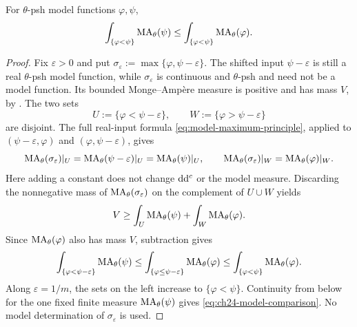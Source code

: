 \begin{proposition}
\label{prop:ch24-model-comparison}
For \(\theta\)-psh model functions \(\varphi,\psi\),
\begin{equation}
\label{eq:ch24-model-comparison}
 \int_{\{\varphi<\psi\}}\operatorname{MA}_\theta(\psi)
 \leq
 \int_{\{\varphi<\psi\}}\operatorname{MA}_\theta(\varphi).
\end{equation}
\end{proposition}

\begin{proof}
Fix \(\varepsilon>0\) and put
\(\sigma_\varepsilon:=\max\{\varphi,\psi-\varepsilon\}\).
The shifted input \(\psi-\varepsilon\) is still a real \(\theta\)-psh
model function, while \(\sigma_\varepsilon\) is continuous and
\(\theta\)-psh and need not be a model function.  Its bounded
Monge--Amp\`ere measure is positive and has mass \(V\), by
.  The two sets
\[
 U:=\{\varphi<\psi-\varepsilon\},
 \qquad W:=\{\varphi>\psi-\varepsilon\}
\]
are disjoint.  The full real-input formula
\eqref{eq:model-maximum-principle}, applied to
\((\psi-\varepsilon,\varphi)\) and
\((\varphi,\psi-\varepsilon)\), gives
\[
 \operatorname{MA}_\theta(\sigma_\varepsilon)|_U
       =\operatorname{MA}_\theta(\psi-\varepsilon)|_U
       =\operatorname{MA}_\theta(\psi)|_U,
 \qquad
 \operatorname{MA}_\theta(\sigma_\varepsilon)|_W
       =\operatorname{MA}_\theta(\varphi)|_W.
\]
Here adding a constant does not change \(\mathrm d\mathrm d^c\) or the model measure.
Discarding the nonnegative mass of \(\operatorname{MA}_\theta(\sigma_\varepsilon)\)
on the complement of \(U\cup W\) yields
\[
 V\geq\int_U\operatorname{MA}_\theta(\psi)+\int_W\operatorname{MA}_\theta(\varphi).
\]
Since \(\operatorname{MA}_\theta(\varphi)\) also has mass \(V\), subtraction gives
\[
 \int_{\{\varphi<\psi-\varepsilon\}}\operatorname{MA}_\theta(\psi)
 \leq\int_{\{\varphi\leq\psi-\varepsilon\}}\operatorname{MA}_\theta(\varphi)
 \leq\int_{\{\varphi<\psi\}}\operatorname{MA}_\theta(\varphi).
\]
Along \(\varepsilon=1/m\), the sets on the left increase to
\(\{\varphi<\psi\}\).  Continuity from below for the one fixed finite
measure \(\operatorname{MA}_\theta(\psi)\) gives
\eqref{eq:ch24-model-comparison}.  No model determination of
\(\sigma_\varepsilon\) is used.
\end{proof}
